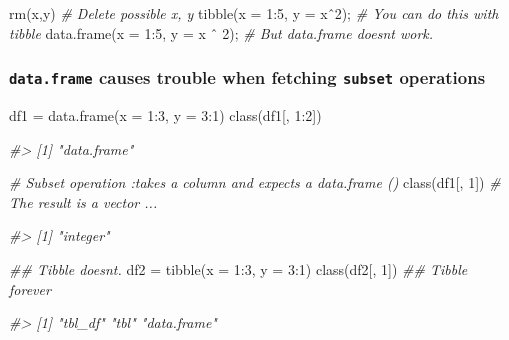 \documentclass[
]{article}
\newenvironment{Shaded}{}{}
\newcommand{\AttributeTok}[1]{\textcolor[rgb]{0.49,0.56,0.16}{#1}}
\newcommand{\CommentTok}[1]{\textcolor[rgb]{0.38,0.63,0.69}{\textit{#1}}}
\newcommand{\DecValTok}[1]{\textcolor[rgb]{0.25,0.63,0.44}{#1}}
\newcommand{\DocumentationTok}[1]{\textcolor[rgb]{0.73,0.13,0.13}{\textit{#1}}}
\newcommand{\FunctionTok}[1]{\textcolor[rgb]{0.02,0.16,0.49}{#1}}
\newcommand{\NormalTok}[1]{#1}
\newcommand{\OtherTok}[1]{\textcolor[rgb]{0.00,0.44,0.13}{#1}}
\newcommand{\SpecialCharTok}[1]{\textcolor[rgb]{0.25,0.44,0.63}{#1}}
\begin{document}
\begin{Shaded}
\begin{Highlighting}[]
\FunctionTok{rm}\NormalTok{(x,y) }\CommentTok{\# Delete possible x, y}
\FunctionTok{tibble}\NormalTok{(}\AttributeTok{x =} \DecValTok{1}\SpecialCharTok{:}\DecValTok{5}\NormalTok{, }\AttributeTok{y =}\NormalTok{ xˆ2); }\CommentTok{\# You can do this with tibble}
\FunctionTok{data.frame}\NormalTok{(}\AttributeTok{x =} \DecValTok{1}\SpecialCharTok{:}\DecValTok{5}\NormalTok{, }\AttributeTok{y =}\NormalTok{ x ˆ }\DecValTok{2}\NormalTok{); }\CommentTok{\# But data.frame doesn\textquotesingle{}t work.}
\end{Highlighting}
\end{Shaded}

\hypertarget{dataframe-causes-trouble-when-fetching-subset-operations}{%
\subsubsection{\texorpdfstring{\texttt{data.frame} causes trouble when
fetching \texttt{subset}
operations}{data.frame causes trouble when fetching subset operations}}\label{dataframe-causes-trouble-when-fetching-subset-operations}}

\begin{Shaded}
\begin{Highlighting}[]
\NormalTok{df1 }\OtherTok{=}
	\FunctionTok{data.frame}\NormalTok{(}\AttributeTok{x =} \DecValTok{1}\SpecialCharTok{:}\DecValTok{3}\NormalTok{, }\AttributeTok{y =} \DecValTok{3}\SpecialCharTok{:}\DecValTok{1}\NormalTok{)}
\FunctionTok{class}\NormalTok{(df1[, }\DecValTok{1}\SpecialCharTok{:}\DecValTok{2}\NormalTok{])}

\CommentTok{\#\textgreater{} [1] "data.frame"}

\CommentTok{\# Subset operation :takes a column and expects a data.frame () }
\FunctionTok{class}\NormalTok{(df1[, }\DecValTok{1}\NormalTok{]) }\CommentTok{\# The result is a vector ...}

\CommentTok{\#\textgreater{} [1] "integer"}

\DocumentationTok{\#\# Tibble doesn\textquotesingle{}t.}
\NormalTok{df2 }\OtherTok{=}
	\FunctionTok{tibble}\NormalTok{(}\AttributeTok{x =} \DecValTok{1}\SpecialCharTok{:}\DecValTok{3}\NormalTok{, }\AttributeTok{y =} \DecValTok{3}\SpecialCharTok{:}\DecValTok{1}\NormalTok{)}
\FunctionTok{class}\NormalTok{(df2[, }\DecValTok{1}\NormalTok{]) }\DocumentationTok{\#\# Tibble forever}

\CommentTok{\#\textgreater{} [1] "tbl\_df" "tbl" "data.frame"}
\end{Highlighting}
\end{Shaded}
\end{document}
